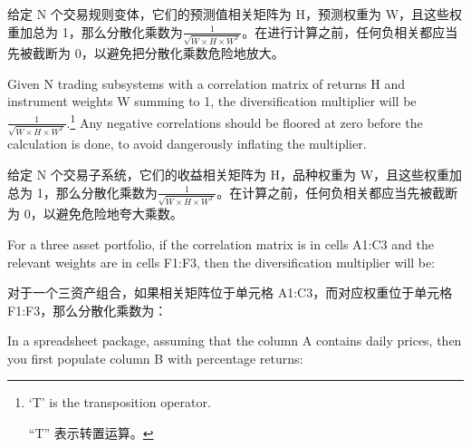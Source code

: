 \begin{chineseblock}给定 N 个交易规则变体，它们的预测值相关矩阵为 H，预测权重为 W，且这些权重加总为 1，那么分散化乘数为\(\frac{1}{\sqrt{W \times H \times W^T}}\)。在进行计算之前，任何负相关都应当先被截断为 0，以避免把分散化乘数危险地放大。\end{chineseblock}


\begin{englishblock} Given N trading subsystems with a correlation matrix of returns H and instrument weights W summing to 1, the diversification multiplier will be \(\frac{1}{\sqrt{W \times H \times W^T}}\).\footnote{‘T' is the transposition operator. \par “T” 表示转置运算。} Any negative correlations should be floored at zero before the calculation is done, to avoid dangerously inflating the multiplier. \end{englishblock}

\begin{chineseblock}给定 N 个交易子系统，它们的收益相关矩阵为 H，品种权重为 W，且这些权重加总为 1，那么分散化乘数为\(\frac{1}{\sqrt{W \times H \times W^T}}\)。在计算之前，任何负相关都应当先被截断为 0，以避免危险地夸大乘数。\end{chineseblock}


\begin{englishblock} For a three asset portfolio, if the correlation matrix is in cells A1:C3 and the relevant weights are in cells F1:F3, then the diversification multiplier will be: \end{englishblock}

\begin{chineseblock}对于一个三资产组合，如果相关矩阵位于单元格 A1:C3，而对应权重位于单元格 F1:F3，那么分散化乘数为：\end{chineseblock}

\begin{quote}
\begingroup\color{\englishbodycolorname} \ttfamily{} \endgroup
\end{quote}


\begin{englishblock} In a spreadsheet package, assuming that the column A contains daily prices, then you first populate column B with percentage returns: \end{englishblock}

